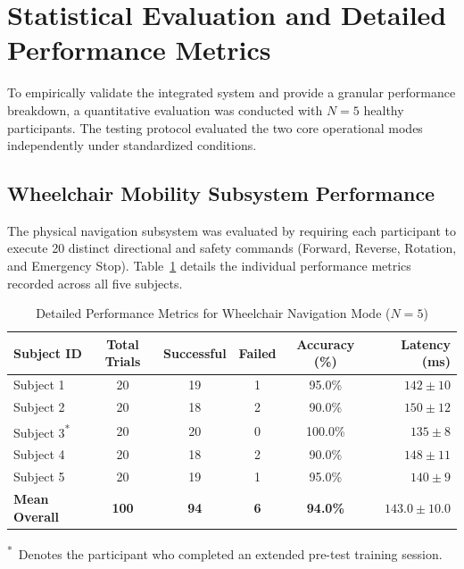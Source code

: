 \section{Statistical Evaluation and Detailed Performance Metrics}
\label{sec:statistical_evaluation}

To empirically validate the integrated system and provide a granular performance breakdown,
a quantitative evaluation was conducted with $N = 5$ healthy participants. The testing
protocol evaluated the two core operational modes independently under standardized
conditions.

\FloatBarrier
\subsection{Wheelchair Mobility Subsystem Performance}
\label{subsec:wheelchair_mobility_performance}

The physical navigation subsystem was evaluated by requiring each participant to execute
20 distinct directional and safety commands (Forward, Reverse, Rotation, and Emergency
Stop). Table~\ref{tab:wheelchair_performance} details the individual performance metrics
recorded across all five subjects.

\begin{table}[H]
  \centering
  \caption{Detailed Performance Metrics for Wheelchair Navigation Mode ($N = 5$)}
  \label{tab:wheelchair_performance}
  \begin{tabular}{lccccr}
    \toprule
    \textbf{Subject ID} &
    \textbf{Total Trials} &
    \textbf{Successful} &
    \textbf{Failed} &
    \textbf{Accuracy (\%)} &
    \textbf{Latency (ms)} \\
    \midrule
    Subject 1  & 20  & 19 & 1 & 95.0\% & $142 \pm 10$ \\
    Subject 2  & 20  & 18 & 2 & 90.0\% & $150 \pm 12$ \\
    Subject 3\textsuperscript{*} & 20 & 20 & 0 & 100.0\% & $135 \pm 8$  \\
    Subject 4  & 20  & 18 & 2 & 90.0\% & $148 \pm 11$ \\
    Subject 5  & 20  & 19 & 1 & 95.0\% & $140 \pm 9$  \\
    \midrule
    \textbf{Mean Overall} & \textbf{100} & \textbf{94} & \textbf{6} &
    \textbf{94.0\%} & $\mathbf{143.0 \pm 10.0}$ \\
    \bottomrule
  \end{tabular}
  \vspace{0.4em}

  \noindent\small\textsuperscript{*}~Denotes the participant who completed an extended
  pre-test training session.
\end{table}

